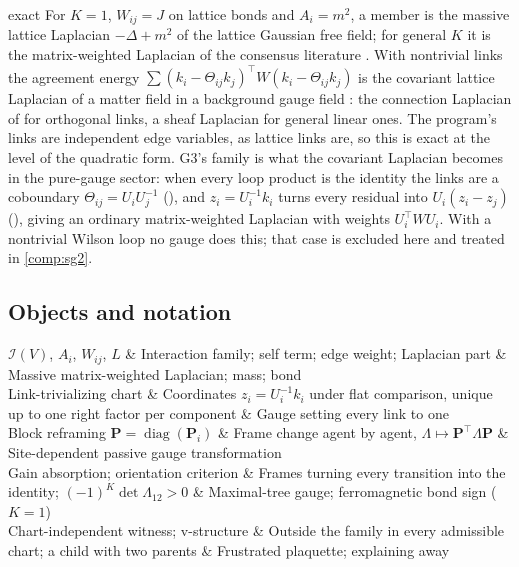 \begin{analogy}{exact}
For \(K=1\), \(W_{ij}=J\) on lattice bonds and \(A_i=m^2\), a member is the massive lattice Laplacian
\(-\Delta+m^2\) of the lattice Gaussian free field; for general \(K\) it is the matrix-weighted Laplacian
of the consensus literature \citep{Trinh2018MatrixWeighted}. With nontrivial links the agreement energy
\(\sum(k_i-\Theta_{ij}k_j)^\top W(k_i-\Theta_{ij}k_j)\) is the covariant lattice Laplacian of a matter field
in a background gauge field \citep{Creutz1983}: the connection Laplacian of \citet{SingerWu2012} for
orthogonal links, a sheaf Laplacian \citep{HansenGhrist2019} for general linear ones. The program's links
are independent edge variables, as lattice links are, so this is exact at the level of the quadratic
form. G3's family is what the covariant Laplacian becomes in the pure-gauge sector: when every loop
product is the identity the links are a coboundary \(\Theta_{ij}=U_iU_j^{-1}\)
(), and \(z_i=U_i^{-1}k_i\) turns every residual into
\(U_i(z_i-z_j)\) (), giving an ordinary matrix-weighted Laplacian with
weights \(U_i^\top WU_i\). With a nontrivial Wilson loop no gauge does this; that case is excluded here
and treated in \cref{comp:sg2}.
\end{analogy}

\subsection{Objects and notation}

\begin{decoder}
\(\mathcal I(V)\), \(A_i\), \(W_{ij}\), \(L\) & Interaction family; self term; edge weight; Laplacian part & Massive matrix-weighted Laplacian; mass; bond\\
Link-trivializing chart & Coordinates \(z_i=U_i^{-1}k_i\) under flat comparison, unique up to one right factor per component & Gauge setting every link to one\\
Block reframing \(\mathbf P=\operatorname{diag}(\mathbf P_i)\) & Frame change agent by agent, \(\Lambda\mapsto\mathbf P^\top\Lambda\mathbf P\) & Site-dependent passive gauge transformation\\
Gain absorption; orientation criterion & Frames turning every transition into the identity; \((-1)^K\det\Lambda_{12}>0\) & Maximal-tree gauge; ferromagnetic bond sign (\(K=1\))\\
Chart-independent witness; v-structure & Outside the family in every admissible chart; a child with two parents & Frustrated plaquette; explaining away\\
\end{decoder}

